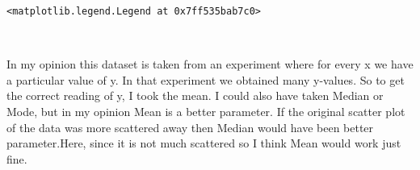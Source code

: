 \documentclass[11pt]{article}
\makeatletter
\newcommand{\boxspacing}{\kern\kvtcb@left@rule\kern\kvtcb@boxsep}
\newcommand{\prompt}[4]{
        {\ttfamily\llap{{\color{#2}[#3]:\hspace{3pt}#4}}\vspace{-\baselineskip}}
    }
\makeatother
\begin{document}
            \begin{tcolorbox}[breakable, size=fbox, boxrule=.5pt, pad at break*=1mm, opacityfill=0]
\prompt{Out}{outcolor}{46}{\boxspacing}
\begin{Verbatim}[commandchars=\\\{\}]
<matplotlib.legend.Legend at 0x7ff535bab7c0>
\end{Verbatim}
\end{tcolorbox}
        
    \begin{center}
    \end{center}
    { \hspace*{\fill} \\}
    
    In my opinion this dataset is taken from an experiment where for every x
we have a particular value of y. In that experiment we obtained many
y-values. So to get the correct reading of y, I took the mean. I could
also have taken Median or Mode, but in my opinion Mean is a better
parameter. If the original scatter plot of the data was more scattered
away then Median would have been better parameter.Here, since it is not
much scattered so I think Mean would work just fine.

    \begin{tcolorbox}[breakable, size=fbox, boxrule=1pt, pad at break*=1mm,colback=cellbackground, colframe=cellborder]
\prompt{In}{incolor}{ }{\boxspacing}
\begin{Verbatim}[commandchars=\\\{\}]

\end{Verbatim}
\end{tcolorbox}


    
    
    
\end{document}
